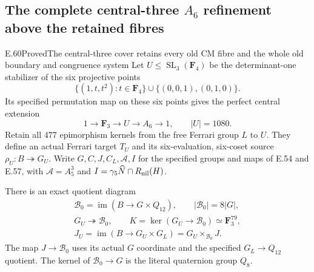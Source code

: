 \subsection{The complete central-three \texorpdfstring{$A_6$}{A6} refinement above the retained fibres}

\begin{statement}{E.60}{Proved}{The central-three cover retains every old CM fibre and the whole old boundary and congruence system}
Let $U\leq\operatorname{SL}_3(\mathbf F_4)$ be the determinant-one
stabilizer of the six projective points
\[
 \{(1,t,t^2):t\in\mathbf F_4\}\cup\{(0,0,1),(0,1,0)\}.
 \tag{E.60.1}
\]
Its specified permutation map on these six points gives the perfect
central extension
\[
 1\longrightarrow\mathbf F_3\longrightarrow U
   \longrightarrow A_6\longrightarrow1,\qquad |U|=1080.
 \tag{E.60.2}
\]
Retain all $477$ epimorphism kernels from the free Ferrari group
$L$ to $U$. They define an actual Ferrari target $T_U$ and its
six-evaluation, six-coset source
$\rho_U:B\twoheadrightarrow G_U$.
Write $G,C,J,C_L,\mathcal A,I$ for the specified groups and maps
of E.54 and E.57, with $\mathcal A=A_5^3$ and
$I=\gamma_5\widehat N\cap R_{\rm nil}(H)$.

There is an exact quotient diagram
\[
 \begin{gathered}
 \mathcal B_0=\operatorname{im}(B\longrightarrow G\times Q_{12}),
 \qquad |\mathcal B_0|=8|G|,\\
 G_U\twoheadrightarrow\mathcal B_0,
 \qquad K=\ker(G_U\longrightarrow\mathcal B_0)
               \simeq\mathbf F_3^{79},\\
 J_U=\operatorname{im}(B\longrightarrow G_U\times G_L)
                 =G_U\times_{\mathcal B_0}J.
 \end{gathered}
 \tag{E.60.3}
\]
The map $J\to\mathcal B_0$ uses its actual $G$ coordinate
and the specified $G_L\to Q_{12}$ quotient. The kernel of
$\mathcal B_0\to G$ is the literal quaternion group $Q_8$.


\end{statement}
